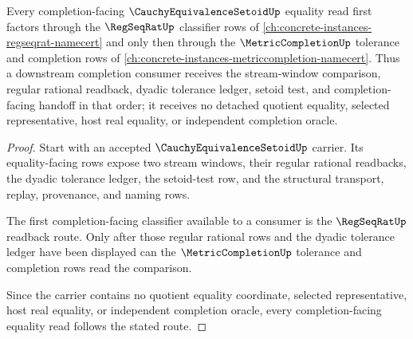 \begin{theorem}
\label{thm:cauchy-equivalence-setoid-regseqrat-completion-classifier}
Every completion-facing $\CauchyEquivalenceSetoidUp$ equality read first factors through the $\RegSeqRatUp$ classifier rows of \autoref{ch:concrete-instances-regseqrat-namecert} and only then through the $\MetricCompletionUp$ tolerance and completion rows of \autoref{ch:concrete-instances-metriccompletion-namecert}. Thus a downstream completion consumer receives the stream-window comparison, regular rational readback, dyadic tolerance ledger, setoid test, and completion-facing handoff in that order; it receives no detached quotient equality, selected representative, host real equality, or independent completion oracle.
\end{theorem}
\begin{proof}
Start with an accepted $\CauchyEquivalenceSetoidUp$ carrier. Its equality-facing rows expose two stream windows, their regular rational readbacks, the dyadic tolerance ledger, the setoid-test row, and the structural transport, replay, provenance, and naming rows.

The first completion-facing classifier available to a consumer is the $\RegSeqRatUp$ readback route. Only after those regular rational rows and the dyadic tolerance ledger have been displayed can the $\MetricCompletionUp$ tolerance and completion rows read the comparison.

Since the carrier contains no quotient equality coordinate, selected representative, host real equality, or independent completion oracle, every completion-facing equality read follows the stated route.
\end{proof}
